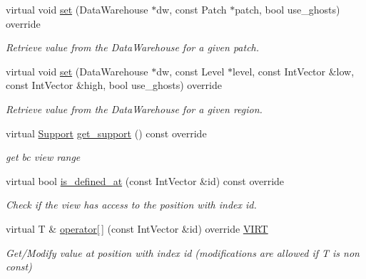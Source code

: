 \begin{DoxyCompactItemize}
virtual void \hyperlink{classUintah_1_1PhaseField_1_1detail_1_1bc__fd_3_01ScalarField_3_01T_01_4_00_01STN_00_01NC_00_01Fc8a6e28ffa258d282d0a921216b0ed9f_a88a1002b012e8aefe6109f263cadf2d7}{set} (Data\+Warehouse $\ast$dw, const Patch $\ast$patch, bool use\+\_\+ghosts) override
\begin{DoxyCompactList}\small\item\em Retrieve value from the Data\+Warehouse for a given patch. \end{DoxyCompactList}\item 
virtual void \hyperlink{classUintah_1_1PhaseField_1_1detail_1_1bc__fd_3_01ScalarField_3_01T_01_4_00_01STN_00_01NC_00_01Fc8a6e28ffa258d282d0a921216b0ed9f_af9bd1a08e740ff69bd66001c82290794}{set} (Data\+Warehouse $\ast$dw, const Level $\ast$level, const Int\+Vector \&low, const Int\+Vector \&high, bool use\+\_\+ghosts) override
\begin{DoxyCompactList}\small\item\em Retrieve value from the Data\+Warehouse for a given region. \end{DoxyCompactList}\item 
virtual \hyperlink{classUintah_1_1PhaseField_1_1Support}{Support} \hyperlink{classUintah_1_1PhaseField_1_1detail_1_1bc__fd_3_01ScalarField_3_01T_01_4_00_01STN_00_01NC_00_01Fc8a6e28ffa258d282d0a921216b0ed9f_a4731083dea627d5f282b4499e899de94}{get\+\_\+support} () const override
\begin{DoxyCompactList}\small\item\em get bc view range \end{DoxyCompactList}\item 
virtual bool \hyperlink{classUintah_1_1PhaseField_1_1detail_1_1bc__fd_3_01ScalarField_3_01T_01_4_00_01STN_00_01NC_00_01Fc8a6e28ffa258d282d0a921216b0ed9f_ae576ddb84c0dd18248dcd0a76be8ca80}{is\+\_\+defined\+\_\+at} (const Int\+Vector \&id) const override
\begin{DoxyCompactList}\small\item\em Check if the view has access to the position with index id. \end{DoxyCompactList}\item 
virtual T \& \hyperlink{classUintah_1_1PhaseField_1_1detail_1_1bc__fd_3_01ScalarField_3_01T_01_4_00_01STN_00_01NC_00_01Fc8a6e28ffa258d282d0a921216b0ed9f_a5ebdbeeeb5f2dae30693ae0d411f1927}{operator\mbox{[}$\,$\mbox{]}} (const Int\+Vector \&id) override \hyperlink{Definitions_8h_a3ce9c14452594b5b9ee3b63f9b3a981e}{V\+I\+RT}
\begin{DoxyCompactList}\small\item\em Get/\+Modify value at position with index id (modifications are allowed if T is non const) \end{DoxyCompactList}\item 

\end{DoxyCompactItemize}
